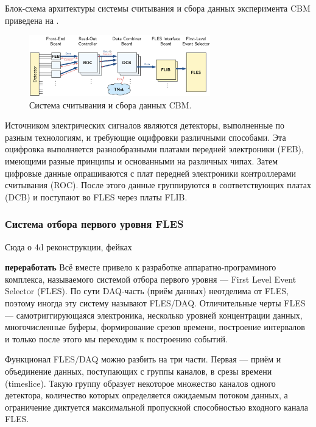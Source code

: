 Блок-схема архитектуры системы считывания и сбора данных эксперимента CBM приведена на .

\begin{figure}[H]
\centering
\includegraphics[width=0.7\textwidth]{pictures/CBMreadout.png}
\caption{Система считывания и сбора данных CBM.}
\label{fig:CBMreadout}
\end{figure}

Источником электрических сигналов являются детекторы, выполненные по разным технологиям, и требующие оцифровки различными способами. Эта оцифровка выполняется разнообразными платами передней электроники (FEB), имеющими разные принципы и основанными на различных чипах. Затем цифровые данные опрашиваются с плат передней электроники контроллерами считывания (ROC). После этого данные группируются в соответствующих платах (DCB) и поступают во FLES через платы FLIB.

\subsubsection{Система отбора первого уровня FLES}\label{sec:secFLES}

Сюда о 4d реконструкции, фейках 

\textbf{переработать}
Всё вместе привело к разработке аппаратно-программного комплекса, называемого системой отбора первого уровня --- First Level Event Selector (FLES). По сути DAQ-часть (приём данных) неотделима от FLES, поэтому иногда эту систему называют FLES/DAQ.
Отличительные черты FLES --- самотриггирующаяся электроника, несколько уровней концентрации данных, многочисленные буферы, формирование срезов времени, построение интервалов и только после этого мы переходим к построению событий.

Функционал FLES/DAQ можно разбить на три части. Первая --- приём и объединение данных, поступающих с группы каналов, в срезы времени (timeslice). Такую группу образует некоторое множество каналов одного детектора, количество которых определяется ожидаемым потоком данных, а ограничение диктуется максимальной пропускной способностью входного канала FLES.

